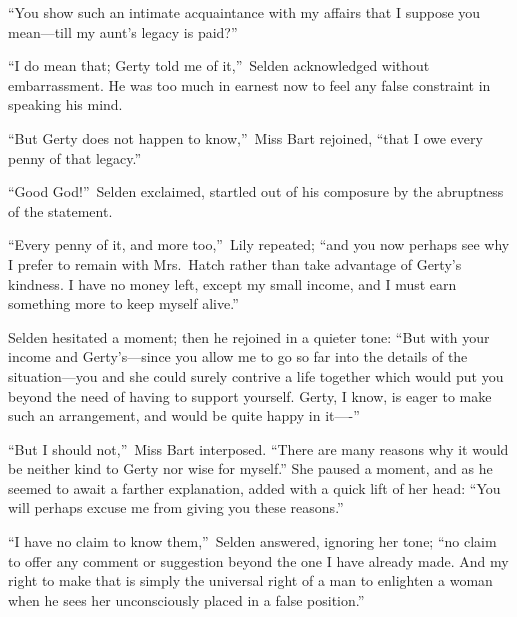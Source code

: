 \documentclass[12pt,a4paper]{book}
\begin{document}
``You show such an intimate acquaintance with my affairs that I
suppose you mean---till my aunt's legacy is paid?''





``I do mean that; Gerty told me of it,''\ Selden acknowledged
without embarrassment. He was too much in earnest now to feel any
false constraint in speaking his mind.





``But Gerty does not happen to know,''\ Miss Bart rejoined, ``that I
owe every penny of that legacy.''





``Good God!''\ Selden exclaimed, startled out of his composure by
the abruptness of the statement.





``Every penny of it, and more too,''\ Lily repeated; ``and you now
perhaps see why I prefer to remain with Mrs.\ Hatch rather than
take advantage of Gerty's kindness. I have no money left, except
my small income, and I must earn something more to keep myself
alive.''





Selden hesitated a moment; then he rejoined in a quieter tone: 
``But with your income and Gerty's---since you allow me to go so
far into the details of the situation---you and she could surely
contrive a life together which would put you beyond the need of
having to support yourself. Gerty, I know, is eager to make such
an arrangement, and would be quite happy in it----''





``But I should not,''\ Miss Bart interposed. ``There are many reasons
why it would be neither kind to Gerty nor wise for myself.'' She
paused a moment, and as he seemed to await a farther
explanation, added with a quick lift of her head: ``You will
perhaps excuse me from giving you these reasons.''





``I have no claim to know them,''\ Selden answered, ignoring her
tone; ``no claim to offer any comment or suggestion beyond the one
I have already made. And my right to make that is simply the
universal right of a man to enlighten a woman when he sees her
unconsciously placed in a false position.''
\end{document}

